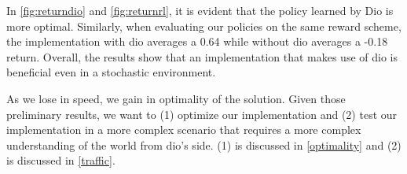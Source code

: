     In \ref{fig:returndio} and \ref{fig:returnrl}, it is evident that the policy learned by Dio 
    is more optimal. Similarly, when evaluating our policies on the same reward scheme, 
    the implementation with dio averages a 0.64 while without dio averages a -0.18 return.
    Overall, the results show that an implementation that makes use of
    dio is beneficial even in a stochastic environment. 

    As we lose in speed, we gain in optimality of the solution. 
    Given those preliminary results, we want to (1) optimize our implementation 
    and (2) test our implementation in a more complex scenario that requires a more complex understanding of the world 
    from dio's side. (1) is discussed in \ref{optimality} and (2) is discussed in \ref{traffic}. 

